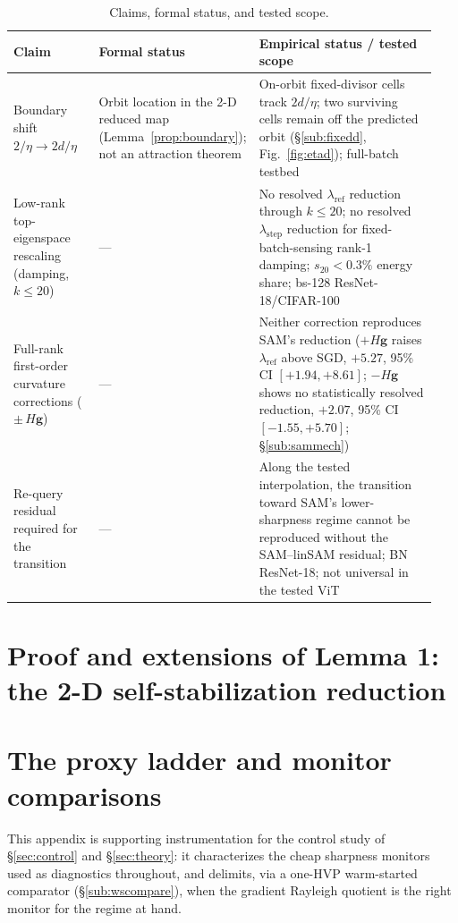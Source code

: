 \documentclass{article}
\theoremstyle{plain}
\theoremstyle{definition}
\theoremstyle{remark}
\newcommand{\lref}{\ensuremath{\lambda_{\mathrm{ref}}}}
\newcommand{\lstep}{\ensuremath{\lambda_{\mathrm{step}}}}
\newcommand{\RTableTopGap}{%
  \setlength{\abovetopsep}{2pt}%
}
\begin{document}
\begin{table}[!t]
\centering
\small
\setlength{\tabcolsep}{3.5pt}
\caption{Claims, formal status, and tested scope.}
\label{tab:claims}
{\renewcommand{\arraystretch}{1.08}\RTableTopGap
\begin{tabular}{@{}p{0.21\linewidth}p{0.24\linewidth}p{0.49\linewidth}@{}}
\toprule
Claim & Formal status & Empirical status / tested scope \\
\midrule
Boundary shift $2/\eta\to2d/\eta$ & Orbit location in the 2-D reduced map (Lemma~\ref{prop:boundary}); not an attraction theorem & On-orbit fixed-divisor cells track $2d/\eta$; two surviving cells remain off the predicted orbit (\S\ref{sub:fixedd}, Fig.~\ref{fig:etad}); full-batch testbed \\
\addlinespace[2pt]
Low-rank top-eigenspace rescaling (damping, $k{\le}20$) & --- & No resolved $\lref$ reduction through $k{\le}20$; no resolved $\lstep$ reduction for fixed-batch-sensing rank-1 damping; $s_{20}<0.3\%$ energy share; bs-128 ResNet-18/CIFAR-100 \\
\addlinespace[2pt]
Full-rank first-order curvature corrections ($\pm\,H\mathbf{g}$) & --- & Neither correction reproduces SAM's reduction ($+H\mathbf{g}$ raises $\lref$ above SGD, $+5.27$, 95\% CI $[{+}1.94,{+}8.61]$; $-H\mathbf{g}$ shows no statistically resolved reduction, $+2.07$, 95\% CI $[{-}1.55,{+}5.70]$; \S\ref{sub:sammech}) \\
\addlinespace[2pt]
Re-query residual required for the transition & --- & Along the tested interpolation, the transition toward SAM's lower-sharpness regime cannot be reproduced without the SAM--linSAM residual; BN ResNet-18; not universal in the tested ViT \\
\bottomrule
\end{tabular}}
\end{table}
\FloatBarrier

\section{Proof and extensions of Lemma 1: the 2-D self-stabilization reduction}
\label{app:theory}


\section{The proxy ladder and monitor comparisons}
\label{app:proxy}
This appendix is supporting instrumentation for the control study of
\S\ref{sec:control} and \S\ref{sec:theory}: it characterizes the cheap
sharpness monitors used as diagnostics throughout, and delimits, via a
one-HVP warm-started comparator (\S\ref{sub:wscompare}), when the
gradient Rayleigh quotient is the right monitor for the regime at hand.
\end{document}

